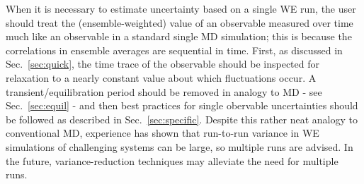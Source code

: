 When it is necessary to estimate uncertainty based on a single WE run, the user should treat the (ensemble-weighted) value of an observable measured over time much like an observable in a standard single MD simulation; this is because the correlations in ensemble averages are sequential in time.
First, as discussed in Sec.\ \ref{sec:quick}, the time trace of the observable should be inspected for relaxation to a nearly constant value about which fluctuations occur.
A transient/equilibration period should be removed in analogy to MD - see Sec.\ \ref{sec:equil} - and then best practices for single obervable uncertainties should be followed as described in Sec.\ \ref{sec:specific}.
Despite this rather neat analogy to conventional MD, experience has shown that run-to-run variance in WE simulations of challenging systems can be  large, so multiple runs are  advised.  In the future, variance-reduction techniques may alleviate the need for multiple runs.
